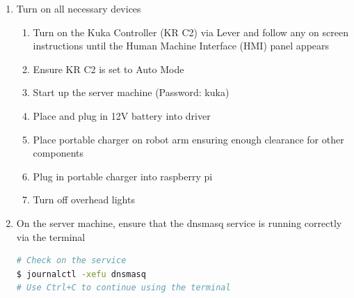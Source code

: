 \documentclass{ol-softwaremanual}
\begin{document}
\begin{enumerate}
    \item Turn on all necessary devices
    \begin{enumerate}
        \item Turn on the Kuka Controller (KR C2) via Lever and follow any on screen instructions until the Human Machine Interface (HMI) panel appears
        \item Ensure KR C2 is set to Auto Mode
        \item Start up the server machine (Password: kuka)
        \item Place and plug in 12V battery into driver
        \item Place portable charger on robot arm ensuring enough clearance for other components
        \item Plug in portable charger into raspberry pi
        \item Turn off overhead lights
    \end{enumerate}
    \item On the server machine, ensure that the dnsmasq service is running correctly via the terminal
    \begin{lstlisting}[language=bash, caption="Checking and Restarting the DNS service on Server machine"]
# Check on the service
$ journalctl -xefu dnsmasq
# Use Ctrl+C to continue using the terminal


\end{lstlisting}
\end{enumerate}
\end{document}
